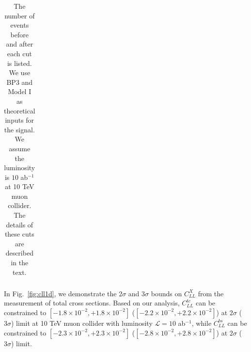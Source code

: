 \documentclass[a4paper,11pt]{article}
\begin{document}
\begin{center}
\begin{table}
\begin{center}
\begin{tabular}{|c|c|c|c|c|c|c|}
  \hline
  \end{tabular}
  \end{center}
  \caption{The number of events before and after each cut is listed. We use BP3 and Model I as theoretical inputs for the signal. We assume the luminosity is $10$ ab$^{-1}$ at 10 TeV muon collider. The details of these cuts are described in the text.\label{table:bs:cut}}
\end{table}
\end{center}

In Fig.~\ref{fig:cll1d}, we demonstrate the $2\sigma$ and $3\sigma$ bounds on $C^{X}_{LL}$ from the measurement of total cross sections. Based on our analysis, $C^{tc}_{LL}$ can be constrained to $[-1.8\times 10^{-2}, +1.8\times 10^{-2}]$ ($[-2.2\times 10^{-2}, +2.2\times10^{-2}]$) at $2\sigma$ ($3\sigma$) limit at 10 TeV muon collider with luminosity $\mathcal{L}=10$ ab$^{-1}$, while 
$C^{bs}_{LL}$ can be constrained to $[-2.3\times 10^{-2}, +2.3 \times 10^{-2}]$ ($[-2.8\times 10^{-2}, +2.8\times 10^{-2}]$) at $2\sigma$ ($3\sigma$) limit. 
\end{document}
